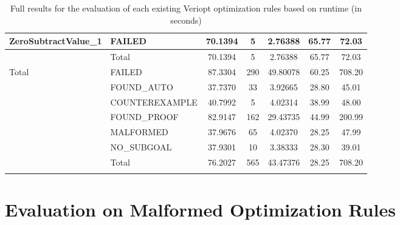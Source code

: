 \begin{appendices}
\begin{longtable}{L{0.25\textwidth} L{0.2\textwidth}  c  c  c  c  c }
    ZeroSubtractValue\_1 & FAILED & 70.1394 & 5 & 2.76388 & 65.77 & 72.03 \\ \midrule 
    & Total & 70.1394 & 5 & 2.76388 & 65.77 & 72.03 \\ \midrule 
    Total & FAILED & 87.3304 & 290 & 49.80078 & 60.25 & 708.20 \\ \midrule 
    & FOUND\_AUTO & 37.7370 & 33 & 3.92665 & 28.80 & 45.01 \\ \midrule 
    & COUNTEREXAMPLE & 40.7992 & 5 & 4.02314 & 38.99 & 48.00 \\ \midrule 
    & FOUND\_PROOF & 82.9147 & 162 & 29.43735 & 44.99 & 200.99 \\ \midrule 
    & MALFORMED & 37.9676 & 65 & 4.02370 & 28.25 & 47.99 \\ \midrule 
    & NO\_SUBGOAL & 37.9301 & 10 & 3.38333 & 28.30 & 39.01 \\ \midrule 
    & Total & 76.2027 & 565 & 43.47376 & 28.25 & 708.20 \\ \bottomrule

    \caption{Full results for the evaluation of each existing Veriopt optimization rules based on runtime (in seconds)} %
    \label{tab:fullEvaluationVeriopt}
\end{longtable}

\chapter{Evaluation on Malformed Optimization Rules}


\end{appendices}
